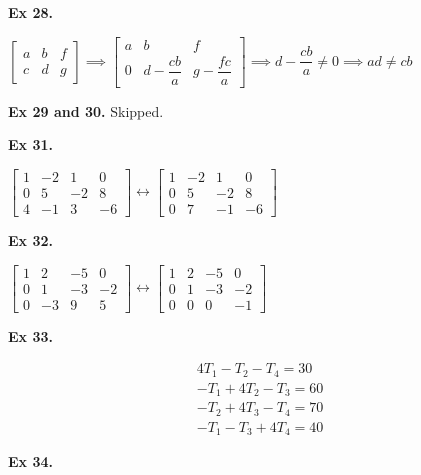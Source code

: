 \documentclass{article}
\begin{document}
\textbf{Ex 28.}

$
\begin{bmatrix}
a &b &f\\
c &d &g
\end{bmatrix}
\implies
\begin{bmatrix}
a &b &f\\
0 &d-\dfrac{cb}{a} &g-\dfrac{fc}{a}
\end{bmatrix}
\implies d-\dfrac{cb}{a} \neq 0 \implies ad \neq cb
$

\textbf{Ex 29 and 30.} Skipped.

\textbf{Ex 31.}

$
\begin{bmatrix}
1 &-2 &1 &0\\
0 &5 &-2 &8\\
4 &-1 &3 &-6
\end{bmatrix}
\leftrightarrow
\begin{bmatrix}
1 &-2 &1 &0\\
0 &5 &-2 &8\\
0 &7 &-1 &-6
\end{bmatrix}
$

\textbf{Ex 32.}

$
\begin{bmatrix}
1 &2 &-5 &0\\
0 &1 &-3 &-2\\
0 &-3 &9 &5
\end{bmatrix}
\leftrightarrow
\begin{bmatrix}
1 &2 &-5 &0\\
0 &1 &-3 &-2\\
0 &0 &0 &-1
\end{bmatrix}
$

\newpage

\textbf{Ex 33.}

\begin{align*}
4T_1 - T_2 - T_4 = 30\\
- T_1 + 4T_2 - T_3 = 60\\
- T_2 + 4T_3 - T_4 = 70\\
- T_1 - T_3 + 4T_4 = 40 
\end{align*}

\textbf{Ex 34.}
\end{document}
